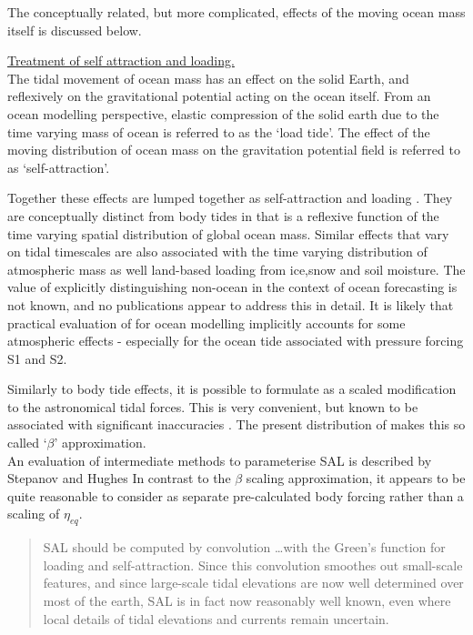 The conceptually related, but more complicated, effects of the moving ocean mass itself is discussed below.

\underline{Treatment of self attraction and loading.} \\
The tidal movement of ocean mass has an effect on the solid Earth, and reflexively on the gravitational potential acting on the ocean itself.
From an ocean modelling perspective, elastic compression of the solid earth due to the time varying mass of ocean is referred to as the `load tide'.  The effect of the moving distribution of ocean mass on the gravitation potential field is referred to as `self-attraction'.

Together these effects are lumped together as self-attraction and loading \SAL{}.  They are conceptually distinct from body tides in that \SAL{} is a reflexive function of the time varying spatial distribution of global ocean mass.
Similar effects that vary on tidal timescales are also associated with the time varying distribution of atmospheric mass as well land-based loading from ice,snow and soil moisture.  The value of explicitly distinguishing non-ocean \SAL{} in the context of ocean forecasting is not known, and no publications appear to address this in detail.  It is likely that practical evaluation of \SAL{} for ocean modelling implicitly accounts for some atmospheric effects - especially for the ocean tide associated with pressure forcing S1 and S2.


Similarly to body tide effects, it is possible to formulate \SAL{} as a scaled modification to the astronomical tidal forces.  This is very convenient, but known to be associated with significant inaccuracies \citep{Ray:1998jl}.  The present distribution of \MOM{} makes this so called `$\beta$' approximation.\\
An evaluation of intermediate methods to parameterise SAL is described by Stepanov and Hughes \citep{Stepanov:2004up}
In contrast to the $\beta$ scaling approximation, it appears to be quite reasonable to consider \SAL{} as separate pre-calculated body forcing rather than a scaling of $\eta_{eq}$. 
\begin{quotation}
SAL should be computed by convolution \dots with the Green's function for loading and self-attraction. Since this convolution smoothes out small-scale features, and since large-scale tidal elevations are now well determined over most	of the earth, SAL is in fact now reasonably well known, even where local details of tidal elevations and currents remain uncertain. \citep{Egbert:2002ug}
\end{quotation}


